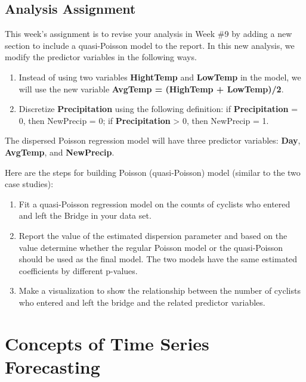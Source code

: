 \documentclass[
]{book}
\begin{document}
\hypertarget{analysis-assignment-4}{%
\section{Analysis Assignment}\label{analysis-assignment-4}}

This week's assignment is to revise your analysis in Week \#9 by adding a new section to include a quasi-Poisson model to the report. In this new analysis, we modify the predictor variables in the following ways.

\begin{enumerate}
\def\labelenumi{\arabic{enumi}.}
\item
  Instead of using two variables \textbf{HightTemp} and \textbf{LowTemp} in the model, we will use the new variable \textbf{AvgTemp = (HighTemp + LowTemp)/2}.
\item
  Discretize \textbf{Precipitation} using the following definition: if \textbf{Precipitation} = 0, then NewPrecip = 0; if \textbf{Precipitation} \textgreater{} 0, then NewPrecip = 1.
\end{enumerate}

The dispersed Poisson regression model will have three predictor variables: \textbf{Day}, \textbf{AvgTemp}, and \textbf{NewPrecip}.

Here are the steps for building Poisson (quasi-Poisson) model (similar to the two case studies):

\begin{enumerate}
\def\labelenumi{\arabic{enumi}.}
\item
  Fit a quasi-Poisson regression model on the counts of cyclists who entered and left the Bridge in your data set.
\item
  Report the value of the estimated dispersion parameter and based on the value determine whether the regular Poisson model or the quasi-Poisson should be used as the final model. The two models have the same estimated coefficients by different p-values.
\item
  Make a visualization to show the relationship between the number of cyclists who entered and left the bridge and the related predictor variables.
\end{enumerate}

\hypertarget{concepts-of-time-series-forecasting}{%
\chapter{Concepts of Time Series Forecasting}\label{concepts-of-time-series-forecasting}}
\end{document}
